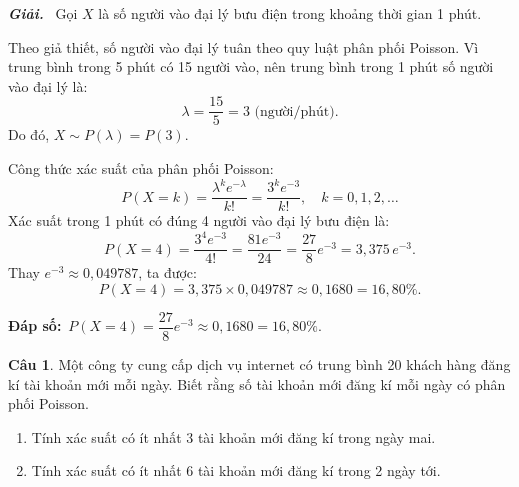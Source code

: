 \documentclass[12pt,a4paper]{article}
\theoremstyle{definition}
\newtheorem{cau}{Câu}
\newcommand{\giai}{\noindent\textbf{\textit{Giải.}}\ }
\newcommand{\dapso}[1]{\noindent\textbf{Đáp số:}\ #1}
\begin{document}
\giai
Gọi $X$ là số người vào đại lý bưu điện trong khoảng thời gian 1 phút.

Theo giả thiết, số người vào đại lý tuân theo quy luật phân phối Poisson. Vì trung bình trong 5 phút có 15 người vào, nên trung bình trong 1 phút số người vào đại lý là:
\[
\lambda = \frac{15}{5} = 3\text{ (người/phút)}.
\]
Do đó, $X \sim P(\lambda) = P(3)$.

Công thức xác suất của phân phối Poisson:
\[
P(X = k) = \frac{\lambda^k e^{-\lambda}}{k!} = \frac{3^k e^{-3}}{k!}, \quad k = 0, 1, 2, \dots
\]
Xác suất trong 1 phút có đúng 4 người vào đại lý bưu điện là:
\[
P(X = 4) = \frac{3^4 e^{-3}}{4!} = \frac{81 e^{-3}}{24} = \frac{27}{8} e^{-3} = 3{,}375\,e^{-3}.
\]
Thay $e^{-3} \approx 0{,}049787$, ta được:
\[
P(X = 4) = 3{,}375 \times 0{,}049787 \approx 0{,}1680 = 16{,}80\%.
\]

\dapso{$P(X = 4) = \dfrac{27}{8}e^{-3} \approx 0{,}1680 = 16{,}80\%$.}

\vspace{1.5em}
\begin{cau}
Một công ty cung cấp dịch vụ internet có trung bình 20 khách hàng đăng kí tài khoản mới mỗi ngày. Biết rằng số tài khoản mới đăng kí mỗi ngày có phân phối Poisson.
\begin{enumerate}[label=\alph*)]
    \item Tính xác suất có ít nhất 3 tài khoản mới đăng kí trong ngày mai.
    \item Tính xác suất có ít nhất 6 tài khoản mới đăng kí trong 2 ngày tới.
\end{enumerate}
\end{cau}
\end{document}
